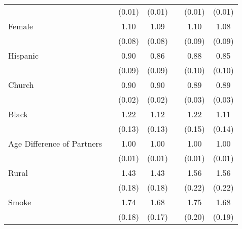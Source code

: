 {\begin{tabular}{l*{6}{c}}
                &                  &   (0.01)         &   (0.01)         &                  &   (0.01)         &   (0.01)         \\
Female          &                  &     1.10         &     1.09         &                  &     1.10         &     1.08         \\
                &                  &   (0.08)         &   (0.08)         &                  &   (0.09)         &   (0.09)         \\
Hispanic        &                  &     0.90         &     0.86         &                  &     0.88         &     0.85         \\
                &                  &   (0.09)         &   (0.09)         &                  &   (0.10)         &   (0.10)         \\
Church          &                  &     0.90\sym{***}&     0.90\sym{***}&                  &     0.89\sym{***}&     0.89\sym{***}\\
                &                  &   (0.02)         &   (0.02)         &                  &   (0.03)         &   (0.03)         \\
Black           &                  &     1.22\sym{*}  &     1.12         &                  &     1.22\sym{*}  &     1.11         \\
                &                  &   (0.13)         &   (0.13)         &                  &   (0.15)         &   (0.14)         \\
Age Difference of Partners&                  &     1.00         &     1.00         &                  &     1.00         &     1.00         \\
                &                  &   (0.01)         &   (0.01)         &                  &   (0.01)         &   (0.01)         \\
Rural           &                  &     1.43\sym{***}&     1.43\sym{***}&                  &     1.56\sym{***}&     1.56\sym{***}\\
                &                  &   (0.18)         &   (0.18)         &                  &   (0.22)         &   (0.22)         \\
Smoke           &                  &     1.74\sym{***}&     1.68\sym{***}&                  &     1.75\sym{***}&     1.68\sym{***}\\
                &                  &   (0.18)         &   (0.17)         &                  &   (0.20)         &   (0.19)         \\

\end{tabular}}
